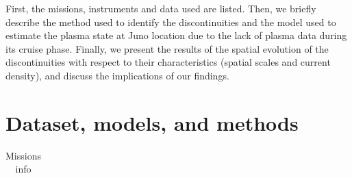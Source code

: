 \documentclass[
]{agujournal2019}
\begin{document}
First, the missions, instruments and data used are listed. Then, we brieﬂy describe the method used to identify the discontinuities and the model used to estimate the plasma state at Juno location due to the lack of plasma data during its cruise phase. Finally, we present the results of the spatial evolution of the discontinuities with respect to their characteristics (spatial scales and current density), and discuss the implications of our findings.

\section{Dataset, models, and methods}\label{dataset-models-and-methods}

\begin{longtable}[]{@{}
  >{\raggedright\arraybackslash}p{}
  >{\raggedright\arraybackslash}p{}
  >{\raggedright\arraybackslash}p{}
  >{\raggedright\arraybackslash}p{}
  >{\raggedright\arraybackslash}p{}
  >{\raggedright\arraybackslash}p{}@{}}

\caption{\label{tbl-missions}Missions info}

\tabularnewline


\end{longtable}
\end{document}
